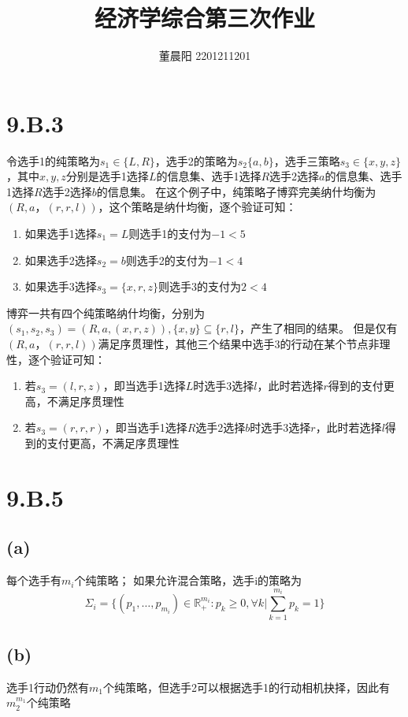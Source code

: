 \documentclass[a4paper,12pt]{ctexart}
\title{经济学综合第三次作业}
\author{董晨阳 2201211201}
\begin{document}
\maketitle
\section*{9.B.3}
令选手1的纯策略为$s_1\in \{ L,R \}$，选手2的策略为$s_2\{ a,b \}$，选手三策略$s_3\in \{ x,y,z \}$，其中$x,y,z$分别是选手1选择$L$的信息集、选手1选择$R$选手2选择$a$的信息集、选手1选择$R$选手2选择$b$的信息集。
在这个例子中，纯策略子博弈完美纳什均衡为$(R,a，(r,r,l))$，这个策略是纳什均衡，逐个验证可知：
\begin{enumerate}
    \item 如果选手1选择$s_1=L$则选手1的支付为$-1<5$
    \item 如果选手2选择$s_2=b$则选手2的支付为$-1<4$
    \item 如果选手3选择$s_3=\{ x,r,z \}$则选手3的支付为$2<4$
\end{enumerate}

博弈一共有四个纯策略纳什均衡，分别为$(s_1,s_2,s_3)=(R,a,(x,r,z)),\{ x,y \}\subseteq \{ r,l \} $，产生了相同的结果。
但是仅有$(R,a，(r,r,l))$满足序贯理性，其他三个结果中选手3的行动在某个节点非理性，逐个验证可知：
\begin{enumerate}
    \item 若$s_3=(l,r,z)$，即当选手1选择$L$时选手3选择$l$，此时若选择$r$得到的支付更高，不满足序贯理性
    \item 若$s_3=(r,r,r)$，即当选手1选择$R$选手2选择$b$时选手3选择$r$，此时若选择$l$得到的支付更高，不满足序贯理性
\end{enumerate}

\section*{9.B.5}
\subsection*{(a)}\label{subsec:a}
每个选手有$m_i$个纯策略；
如果允许混合策略，选手i的策略为$$\Sigma_i=\{ (p_1,\dots,p_{m_i} )\in \mathbb{R}_{+}^{m_i}:p_k\ge0,\forall k|\sum_{k=1}^{m_i}p_k=1 \}$$

\subsection*{(b)}
选手1行动仍然有$m_1$个纯策略，但选手2可以根据选手1的行动相机抉择，因此有$m_2^{m_1}$个纯策略
\end{document}
